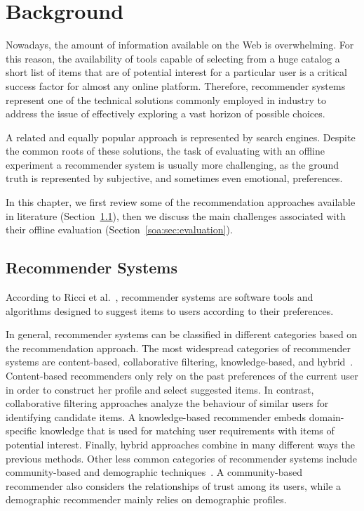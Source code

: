 \chapter{Background}
\label{chap:background}

Nowadays, the amount of information available on the Web is overwhelming. For this reason, the availability of tools capable of selecting from a huge catalog a short list of items that are of potential interest for a particular user is a critical success factor for almost any online platform. Therefore, recommender systems represent one of the technical solutions commonly employed in industry to address the issue of effectively exploring a vast horizon of possible choices.

A related and equally popular approach is represented by search engines. Despite the common roots of these solutions, the task of evaluating with an offline experiment a recommender system is usually more challenging, as the ground truth is represented by subjective, and sometimes even emotional, preferences.

In this chapter, we first review some of the recommendation approaches available in literature (Section~\ref{soa:sec:recommender}), then we discuss the main challenges associated with their offline evaluation (Section~\ref{soa:sec:evaluation}).

\section{Recommender Systems}
\label{soa:sec:recommender}

According to Ricci et al.~\cite{Ricci2015}, recommender systems are software tools and algorithms designed to suggest items to users according to their preferences.

In general, recommender systems can be classified in different categories based on the recommendation approach. The most widespread categories of recommender systems are content-based, collaborative filtering, knowledge-based, and hybrid~\cite{Adomavicius2005}. Content-based recommenders only rely on the past preferences of the current user in order to construct her profile and select suggested items. In contrast, collaborative filtering approaches analyze the behaviour of similar users for identifying candidate items. A knowledge-based recommender embeds domain-specific knowledge that is used for matching user requirements with items of potential interest. Finally, hybrid approaches combine in many different ways the previous methods. Other less common categories of recommender systems include community-based and demographic techniques~\cite{Burke2007}. A community-based recommender also considers the relationships of trust among its users, while a demographic recommender mainly relies on demographic profiles.


